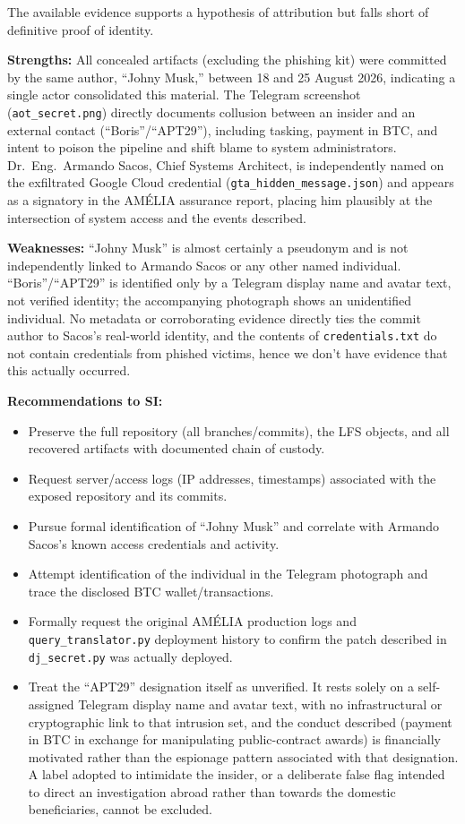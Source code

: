 \documentclass[11pt,a4paper,final,oneside]{article}
\begin{document}
The available evidence supports a hypothesis of attribution but falls short of definitive proof of identity.

\textbf{Strengths:} All concealed artifacts (excluding the phishing kit) were committed by the same author, ``Johny Musk,'' between 18 and 25 August 2026, indicating a single actor consolidated this material. The Telegram screenshot (\texttt{aot\_secret.png}) directly documents collusion between an insider and an external contact (``Boris''/``APT29''), including tasking, payment in BTC, and intent to poison the pipeline and shift blame to system administrators. Dr.\ Eng.\ Armando Sacos, Chief Systems Architect, is independently named on the exfiltrated Google Cloud credential (\texttt{gta\_hidden\_message.json}) and appears as a signatory in the AM\'ELIA assurance report, placing him plausibly at the intersection of system access and the events described.

\textbf{Weaknesses:} ``Johny Musk'' is almost certainly a pseudonym and is not independently linked to Armando Sacos or any other named individual. ``Boris''/``APT29'' is identified only by a Telegram display name and avatar text, not verified identity; the accompanying photograph shows an unidentified individual. No metadata or corroborating evidence directly ties the commit author to Sacos's real-world identity, and the contents of \texttt{credentials.txt} do not contain credentials from phished victims, hence we don't have evidence that this actually occurred.

\textbf{Recommendations to SI:}
\begin{itemize}
    \item Preserve the full repository (all branches/commits), the LFS objects, and all recovered artifacts with documented chain of custody.
    \item Request server/access logs (IP addresses, timestamps) associated with the exposed repository and its commits.
    \item Pursue formal identification of ``Johny Musk'' and correlate with Armando Sacos's known access credentials and activity.
    \item Attempt identification of the individual in the Telegram photograph and trace the disclosed BTC wallet/transactions.
    \item Formally request the original AM\'ELIA production logs and \texttt{query\_translator.py} deployment history to confirm the patch described in \texttt{dj\_secret.py} was actually deployed.
    \item Treat the ``APT29'' designation itself as unverified. It rests solely on a self-assigned Telegram display name and avatar text, with no infrastructural or cryptographic link to that intrusion set, and the conduct described (payment in BTC in exchange for manipulating public-contract awards) is financially motivated rather than the espionage pattern associated with that designation. A label adopted to intimidate the insider, or a deliberate false flag intended to direct an investigation abroad rather than towards the domestic beneficiaries, cannot be excluded.
\end{itemize}
\end{document}
